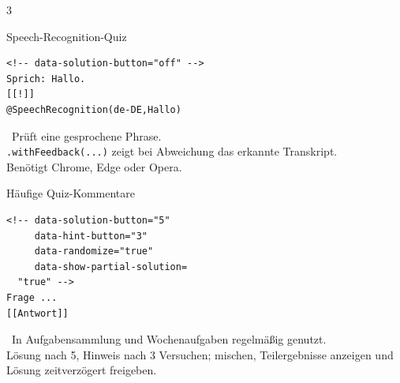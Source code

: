 \documentclass[a4paper,landscape,9pt]{extarticle}
\newcommand{\prevsm}[1]{{\footnotesize\color{muted} #1}}
\begin{document}
\begin{multicols}{3}
\begin{liacard}{Speech-Recognition-Quiz}
\begin{lstlisting}[language=lia]
<!-- data-solution-button="off" -->
Sprich: Hallo.
[[!]]
@SpeechRecognition(de-DE,Hallo)
\end{lstlisting}
\tcblower
\prevsm{\faMicrophone~Prüft eine gesprochene Phrase.\\[2pt]
\texttt{.withFeedback(...)} zeigt bei Abweichung das erkannte Transkript.\\[2pt]
{\footnotesize Benötigt Chrome, Edge oder Opera.}}
\end{liacard}

\begin{liacard}{Häufige Quiz-Kommentare}
\begin{lstlisting}[language=lia]
<!-- data-solution-button="5"
     data-hint-button="3"
     data-randomize="true"
     data-show-partial-solution=
  "true" -->
Frage ...
[[Antwort]]
\end{lstlisting}
\tcblower
\prevsm{\faSlidersH~In Aufgabensammlung und Wochenaufgaben regelmäßig genutzt.\\[2pt]
Lösung nach 5, Hinweis nach 3 Versuchen; mischen, Teilergebnisse anzeigen und Lösung zeitverzögert freigeben.}
\end{liacard}

\end{multicols}
\end{document}
